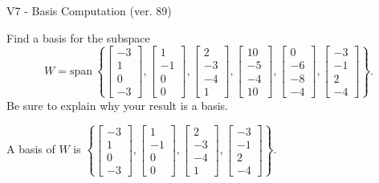 \begin{exercise}
  \begin{exerciseTitle}V7 - Basis Computation (ver. 89)\end{exerciseTitle}
  \begin{exerciseStatement}
    Find a basis for the subspace 
\[W=\mathrm{span}\ \left\{\left[\begin{array}{r}
-3 \\
1 \\
0 \\
-3
\end{array}\right] , \left[\begin{array}{r}
1 \\
-1 \\
0 \\
0
\end{array}\right] , \left[\begin{array}{r}
2 \\
-3 \\
-4 \\
1
\end{array}\right] , \left[\begin{array}{r}
10 \\
-5 \\
-4 \\
10
\end{array}\right] , \left[\begin{array}{r}
0 \\
-6 \\
-8 \\
-4
\end{array}\right] , \left[\begin{array}{r}
-3 \\
-1 \\
2 \\
-4
\end{array}\right]\right\}.\]
 Be sure to explain why your result is a basis.


  \end{exerciseStatement}
  \begin{exerciseAnswer}
   A basis of \(W\) is  \(\left\{\left[\begin{array}{r}
-3 \\
1 \\
0 \\
-3
\end{array}\right] , \left[\begin{array}{r}
1 \\
-1 \\
0 \\
0
\end{array}\right] , \left[\begin{array}{r}
2 \\
-3 \\
-4 \\
1
\end{array}\right] , \left[\begin{array}{r}
-3 \\
-1 \\
2 \\
-4
\end{array}\right]\right\}\).
  


  \end{exerciseAnswer}
\end{exercise}